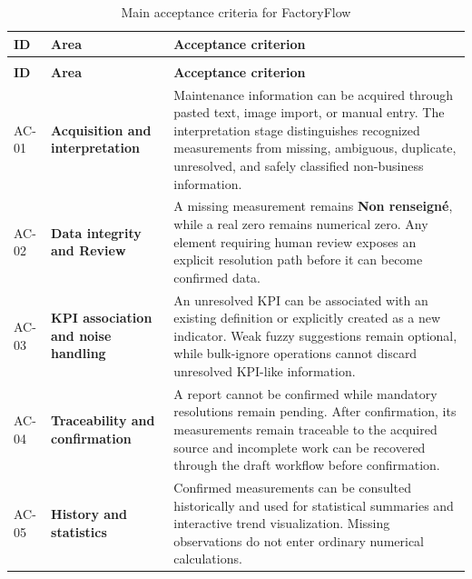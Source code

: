 \begin{longtable}{
    |>{\centering\arraybackslash\bfseries}p{}
    |>{\raggedright\arraybackslash\bfseries}p{}
    |>{\raggedright\arraybackslash}p{}|
}

\caption{Main acceptance criteria for FactoryFlow}
\label{tab:acceptance-criteria}
\\

\hline
\textbf{ID} & \textbf{Area} & \textbf{Acceptance criterion}
\\
\hline
\endfirsthead

\multicolumn{3}{c}{
    \textit{Table~\ref{tab:acceptance-criteria} -- continued}
}
\\[4pt]

\hline
\textbf{ID} & \textbf{Area} & \textbf{Acceptance criterion}
\\
\hline
\endhead

AC-01
&
Acquisition and interpretation
&
Maintenance information can be acquired through pasted text, image import, or
manual entry. The interpretation stage distinguishes recognized measurements
from missing, ambiguous, duplicate, unresolved, and safely classified
non-business information.
\\
\hline

AC-02
&
Data integrity and Review
&
A missing measurement remains \textbf{Non renseigné}, while a real zero
remains numerical zero. Any element requiring human review exposes an explicit
resolution path before it can become confirmed data.
\\
\hline

AC-03
&
KPI association and noise handling
&
An unresolved KPI can be associated with an existing definition or explicitly
created as a new indicator. Weak fuzzy suggestions remain optional, while
bulk-ignore operations cannot discard unresolved KPI-like information.
\\
\hline

AC-04
&
Traceability and confirmation
&
A report cannot be confirmed while mandatory resolutions remain pending.
After confirmation, its measurements remain traceable to the acquired source
and incomplete work can be recovered through the draft workflow before
confirmation.
\\
\hline

AC-05
&
History and statistics
&
Confirmed measurements can be consulted historically and used for statistical
summaries and interactive trend visualization. Missing observations do not
enter ordinary numerical calculations.
\\
\hline


\end{longtable}
